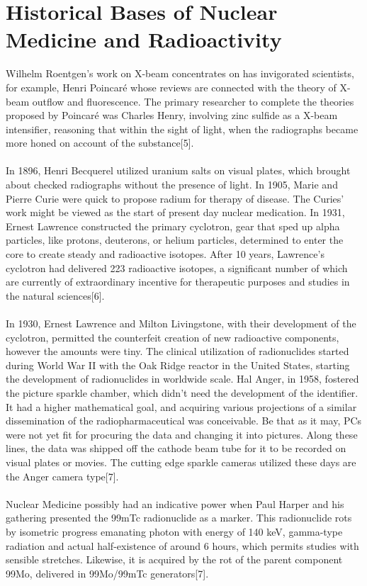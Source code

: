 \documentclass[12pt]{article}
\begin{document}
\section{Historical Bases of Nuclear Medicine and Radioactivity}
Wilhelm Roentgen's work on X-beam concentrates on has invigorated scientists, for example, Henri Poincaré whose reviews are connected with the theory of X-beam outflow and fluorescence. The primary researcher to complete the theories proposed by Poincaré was Charles Henry, involving zinc sulfide as a X-beam intensifier, reasoning that within the sight of light, when the radiographs became more honed on account of the substance[5].
\\
\\
In 1896, Henri Becquerel utilized uranium salts on visual plates, which brought about checked radiographs without the presence of light. In 1905, Marie and Pierre Curie were quick to propose radium for therapy of disease. The Curies' work might be viewed as the start of present day nuclear medication. In 1931, Ernest Lawrence constructed the primary cyclotron, gear that sped up alpha particles, like protons, deuterons, or helium particles, determined to enter the core to create steady and radioactive isotopes. After 10 years, Lawrence's cyclotron had delivered 223 radioactive isotopes, a significant number of which are currently of extraordinary incentive for therapeutic purposes and studies in the natural sciences[6].
\\
\\
In 1930, Ernest Lawrence and Milton Livingstone, with their development of the cyclotron, permitted the counterfeit creation of new radioactive components, however the amounts were tiny. The clinical utilization of radionuclides started during World War II with the Oak Ridge reactor in the United States, starting the development of radionuclides in worldwide scale. Hal Anger, in 1958, fostered the picture sparkle chamber, which didn't need the development of the identifier. It had a higher mathematical goal, and acquiring various projections of a similar dissemination of the radiopharmaceutical was conceivable. Be that as it may, PCs were not yet fit for procuring the data and changing it into pictures. Along these lines, the data was shipped off the cathode beam tube for it to be recorded on visual plates or movies. The cutting edge sparkle cameras utilized these days are the Anger camera type[7].
\\
\\
Nuclear Medicine possibly had an indicative power when Paul Harper and his gathering presented the 99mTc radionuclide as a marker. This radionuclide rots by isometric progress emanating photon with energy of 140 keV, gamma-type radiation and actual half-existence of around 6 hours, which permits studies with sensible stretches. Likewise, it is acquired by the rot of the parent component 99Mo, delivered in 99Mo/99mTc generators[7].
\end{document}
